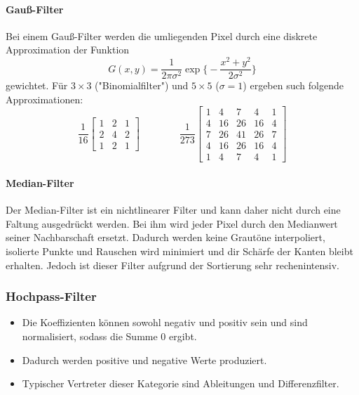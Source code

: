 				\paragraph{Gauß-Filter}
					Bei einem Gauß-Filter werden die umliegenden Pixel durch eine diskrete Approximation der Funktion
					\begin{equation*}
						G(x, y) = \frac{1}{2\pi\sigma^2} \exp \Bigg\{ -\frac{x^2 + y^2}{2\sigma^2} \Bigg\}
					\end{equation*}
					gewichtet. Für \( 3 \times 3 \) ("Binomialfilter") und \( 5 \times 5 \) (\( \sigma = 1 \)) ergeben such folgende Approximationen:
					\begin{equation*}
						\frac{1}{16}
						\begin{bmatrix}
							1 & 2 & 1 \\
							2 & 4 & 2 \\
							1 & 2 & 1
						\end{bmatrix}
						\quad\quad\quad\quad
						\frac{1}{273}
						\begin{bmatrix}
							1 & 4  & 7  & 4  & 1 \\
							4 & 16 & 26 & 16 & 4 \\
							7 & 26 & 41 & 26 & 7 \\
							4 & 16 & 26 & 16 & 4 \\
							1 & 4  & 7  & 4  & 1
						\end{bmatrix}
					\end{equation*}

				\paragraph{Median-Filter}
					Der Median-Filter ist ein nichtlinearer Filter und kann daher nicht durch eine Faltung ausgedrückt werden. Bei ihm wird jeder Pixel durch den Medianwert seiner Nachbarschaft ersetzt. Dadurch werden keine Grautöne interpoliert, isolierte Punkte und Rauschen wird minimiert und dir Schärfe der Kanten bleibt erhalten. Jedoch ist dieser Filter aufgrund der Sortierung sehr rechenintensiv.

			\subsubsection{Hochpass-Filter}
				\begin{itemize}
					\item Die Koeffizienten können sowohl negativ und positiv sein und sind normalisiert, sodass die Summe \num{0} ergibt.
					\item Dadurch werden positive und negative Werte produziert.
					\item Typischer Vertreter dieser Kategorie sind Ableitungen und Differenzfilter.
				\end{itemize}
			
